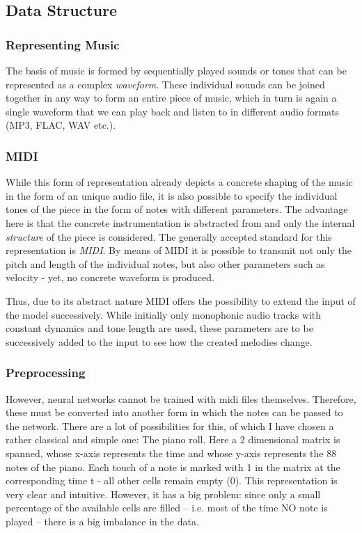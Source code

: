 \documentclass[a4paper, 10pt, xcolor=dvipsnames]{article} %
\begin{document}
\subsection{Data Structure}

\subsubsection{Representing Music}

The basis of music is formed by sequentially played sounds or tones that can
be represented as a complex \emph{waveform}. These individual sounds can be joined
together in any way to form an entire piece of music, which in turn is again a
single waveform that we can play back and listen to in different audio
formats (MP3, FLAC, WAV etc.).

\subsubsection{MIDI}

While this form of representation already depicts a concrete shaping of the
music in the form of an unique audio file, it is also possible to specify the
individual tones of the piece in the form of notes with different parameters.
The advantage here is that the concrete instrumentation is abstracted from and
only the internal \emph{structure} of the piece is considered. The generally
accepted standard for this representation is \emph{MIDI}. By means of MIDI it
is possible to transmit not only the pitch and length of the individual notes,
but also other parameters such as velocity - yet, no concrete waveform is
produced.

Thus, due to its abstract nature MIDI offers the possibility to extend the
input of the model successively. While initially only monophonic audio tracks
with constant dynamics and tone length are used, these parameters are to be
successively added to the input to see how the created melodies change.

\subsubsection{Preprocessing}
However, neural networks cannot be trained with midi files themselves.
Therefore, these must be converted into another form in which the notes can be
passed to the network. There are a lot of possibilities for this, of which I
have chosen a rather classical and simple one: The piano roll. Here a 2
dimensional matrix is spanned, whose x-axis represents the time and whose
y-axis represents the 88 notes of the piano. Each touch of a note is marked
with 1 in the matrix at the corresponding time t - all other cells remain empty
(0). This representation is very clear and intuitive. However, it has a big
problem: since only a small percentage of the available cells are filled --
i.e. most of the time NO note is played -- there is a big imbalance in the
data.
\end{document}
